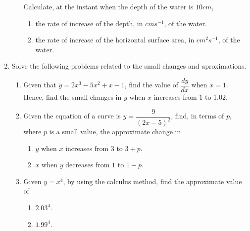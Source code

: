 \documentclass{report}
\begin{document}
\begin{multicols*}{2}
\begin{enumerate}
\begin{enumerate}
\begin{center}
                              \end{center}
                              Calculate, at the instant when the depth of the water is $10\textit{cm}$,
                              \begin{enumerate}
                                    \item the rate of increase of the depth, in $\textit{cm} s^{-1}$, of the water.
                                    \item the rate of increase of the horizontal surface area, in $\textit{cm}^2 s^{-1}$,
                                          of the water.
                              \end{enumerate}
                  \end{enumerate}

            \item Solve the following problems related to the small changes and aproximations.
                  \begin{enumerate}
                        \item Given that $y = 2x^3 - 5x^2 + x - 1$, find the value of $\dfrac{dy}{dx}$ when
                              $x = 1$. Hence, find the small changes in $y$ when $x$ increases from $1$ to
                              $1.02$.
                        \item Given the equation of a curve is $y = \dfrac{9}{{(2x - 5)}^2}$, find, in terms
                              of $p$, where $p$ is a small value, the approximate change in
                              \begin{enumerate}
                                    \item $y$ when $x$ increases from $3$ to $3 + p$.
                                    \item $x$ when $y$ decreases from $1$ to $1 - p$.
                              \end{enumerate}
                        \item Given $y = x^4$, by using the calculus method, find the approximate value of
                              \begin{enumerate}
                                    \item $2.03^4$.
                                    \item $1.99^4$.
                              \end{enumerate}
                  \end{enumerate}

\end{enumerate}
\end{multicols*}
\end{document}
